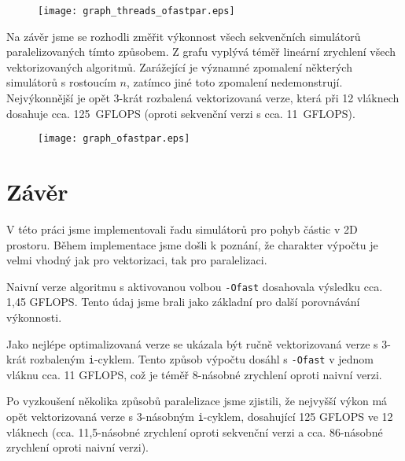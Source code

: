 \documentclass[10pt,a4paper]{article}
\begin{document}
\begin{figure}[h!]
    \centering
    \texttt{[image: graph\_threads\_ofastpar.eps]}
    \label{fig:4}
\end{figure}

Na závěr jsme se rozhodli změřit výkonnost všech sekvenčních
simulátorů paralelizovaných tímto způsobem. Z grafu vyplývá téměř
lineární zrychlení všech vektorizovaných algoritmů. Zarážející je
významné zpomalení některých simulátorů s rostoucím $ n $, zatímco
jiné toto zpomalení nedemonstrují. Nejvýkonnější je opět 3-krát
rozbalená vektorizovaná verze, která při 12 vláknech dosahuje
cca. 125~GFLOPS (oproti sekvenční verzi s cca. 11~GFLOPS).

\begin{figure}[h!]
    \centering
    \texttt{[image: graph\_ofastpar.eps]}
    \label{fig:5}
\end{figure}

\pagebreak
\section{Závěr}
V této práci jsme implementovali řadu simulátorů pro pohyb částic v 2D
prostoru. Během implementace jsme došli k poznání, že charakter výpočtu
je velmi vhodný jak pro vektorizaci, tak pro paralelizaci.

Naivní verze algoritmu s aktivovanou volbou \texttt{-Ofast} dosahovala
výsledku cca. 1,45 GFLOPS. Tento údaj jsme brali jako základní pro další
porovnávání výkonnosti.

Jako nejlépe optimalizovaná verze se ukázala být ručně vektorizovaná
verze s 3-krát rozbaleným \texttt{i}-cyklem. Tento způsob výpočtu
dosáhl s \texttt{-Ofast} v jednom vláknu cca. 11 GFLOPS, což je téměř
8-násobné zrychlení oproti naivní verzi.

Po vyzkoušení několika způsobů paralelizace jsme zjistili, že nejvyšší
výkon má opět vektorizovaná verze s 3-násobným \texttt{i}-cyklem, dosahující
125 GFLOPS ve 12 vláknech (cca. 11,5-násobné zrychlení oproti sekvenční verzi
a cca. 86-násobné zrychlení oproti naivní verzi).
\end{document}
